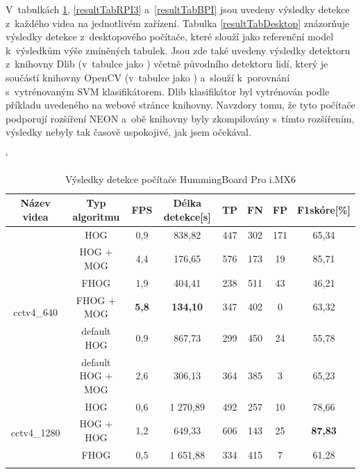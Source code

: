 V~tabulkách \ref{resultTabIMX}, \ref{resultTabRPI3} a~\ref{resultTabBPI} jsou uvedeny výsledky detekce z~každého videa na jednotlivém zařízení. Tabulka \ref{resultTabDesktop} znázorňuje výsledky detekce z~desktopového počítače, které slouží jako referenční model k~výsledkům výše zmíněných tabulek.  
Jsou zde také uvedeny výsledky detektoru z~knihovny Dlib (v~tabulce jako ) včetně původního detektoru lidí, který je součástí knihovny OpenCV (v~tabulce jako ) a~slouží k~porovnání s~vytrénovaným SVM klasifikátorem. Dlib klasifikátor byl vytrénován podle příkladu uvedeného na webové stránce knihovny. 
Navzdory tomu, že tyto počítače podporují rozšíření NEON a~obě knihovny byly zkompilovány s~tímto rozšířením, výsledky nebyly tak časově uspokojivé, jak jsem očekával. 
\begin{table}[H]
\catcode`
\centering
\caption{Výsledky detekce počítače HummingBoard Pro i.MX6 }
\label{resultTabIMX}
\begin{tabular}{|c|c|c|c|c|c|c|c|}
\hline
{Název videa}        & Typ algoritmu  & FPS & Délka detekce[s] & TP           & FN      & FP      & F1skóre[\%] \\  \hline
\multirow{6}{*}{cctv4\_640}  & HOG &    0,9 & 838,82  & 447 &      302 &     171 &   65,34      \\ \cline{2-8}  
      & HOG + MOG                  &    4,4 & 176,65  & 576 &    173 &     19 &      85,71      \\ \cline{2-8}  
      & FHOG                       &    1,9 & 404,41  & 238 &    511 &     43 &      46,21      \\ \cline{2-8}  
      & FHOG + MOG                 &    \textbf{5,8} & \textbf{134,10}   & 347 &    402 &     0 &       63,32      \\ \cline{2-8} 
      &  default HOG               &    0,9 & 867,73  & 299 &    450 &     24 &      55,78      \\ \cline{2-8}  
      &  default HOG + MOG         &    2,6 & 306,13  & 364 &    385 &     3 &       65,23      \\ \hline \hline   
\multirow{6}{*}{cctv4\_1280}& HOG   &    0,6 & 1 270,89  & 492 &    257 &     10 &      78,66      \\ \cline{2-8}  
      & HOG + HOG                  &    1,2 & 649,33  & 606 &    143 &     25 &      \textbf{87,83}      \\ \cline{2-8}  
      & FHOG                       &    0,5 & 1 651,88  & 334 &    415 &     7 &       61,28      \\ \cline{2-8}  

\end{tabular}
\end{table}
